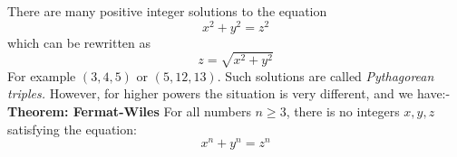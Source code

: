 \documentclass[a4paper]{article}
\begin{document}
There are many positive integer solutions to the equation
\[ x^2 + y^2 = z^2 \]
which can be rewritten as
\[ z=\sqrt{x^2 + y^2} \]
For example \( (3, 4, 5) \) or \( (5, 12, 13) \). Such solutions are called \textit{Pythagorean triples.}
However, for higher powers the situation is very different, and we have:-
\textbf{Theorem: Fermat-Wiles} For all numbers \( n\geq 3 \), there is no integers \( x, y, z \) satisfying the equation:
\[ x^n + y^n = z^n \]
\end{document}
